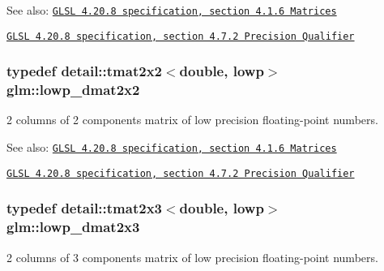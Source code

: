 \begin{Desc}
\item[See also:]\href{http://www.opengl.org/registry/doc/GLSLangSpec.4.20.8.pdf}{\tt GLSL 4.20.8 specification, section 4.1.6 Matrices} 

\href{http://www.opengl.org/registry/doc/GLSLangSpec.4.20.8.pdf}{\tt GLSL 4.20.8 specification, section 4.7.2 Precision Qualifier} \end{Desc}
\hypertarget{group__core__precision_g68b486ff22814c1a3781378513a9fcc0}{
\subsubsection[lowp\_\-dmat2x2]{\setlength{\rightskip}{0pt plus 5cm}typedef detail::tmat2x2$<$double, lowp$>$ {\bf glm::lowp\_\-dmat2x2}}}
\label{group__core__precision_g68b486ff22814c1a3781378513a9fcc0}


2 columns of 2 components matrix of low precision floating-point numbers.

\begin{Desc}
\item[See also:]\href{http://www.opengl.org/registry/doc/GLSLangSpec.4.20.8.pdf}{\tt GLSL 4.20.8 specification, section 4.1.6 Matrices} 

\href{http://www.opengl.org/registry/doc/GLSLangSpec.4.20.8.pdf}{\tt GLSL 4.20.8 specification, section 4.7.2 Precision Qualifier} \end{Desc}
\hypertarget{group__core__precision_g2c7432984a35cf72050870a54485ef35}{
\subsubsection[lowp\_\-dmat2x3]{\setlength{\rightskip}{0pt plus 5cm}typedef detail::tmat2x3$<$double, lowp$>$ {\bf glm::lowp\_\-dmat2x3}}}
\label{group__core__precision_g2c7432984a35cf72050870a54485ef35}


2 columns of 3 components matrix of low precision floating-point numbers.

